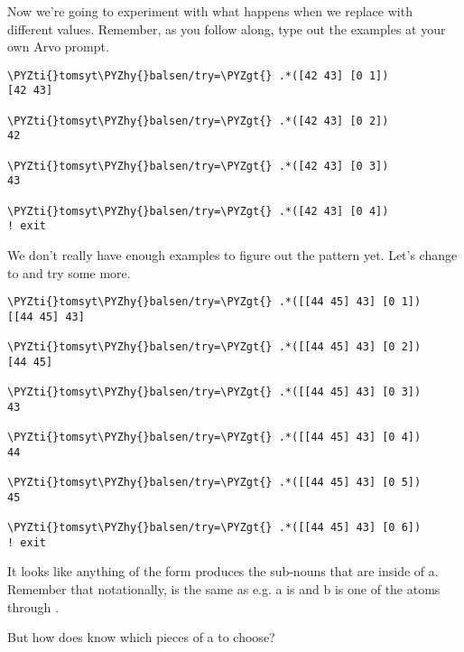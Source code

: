 Now we're going to experiment with what happens when we replace  with
different values. Remember, as you follow along, type out the examples at your
own Arvo prompt.
\begin{framed_shaded}
\begin{Verbatim}[fontsize=\relsize{-2.5},fontseries=b,commandchars=\\\{\}]
\PYZti{}tomsyt\PYZhy{}balsen/try=\PYZgt{} .*([42 43] [0 1])
[42 43]

\PYZti{}tomsyt\PYZhy{}balsen/try=\PYZgt{} .*([42 43] [0 2])
42

\PYZti{}tomsyt\PYZhy{}balsen/try=\PYZgt{} .*([42 43] [0 3])
43

\PYZti{}tomsyt\PYZhy{}balsen/try=\PYZgt{} .*([42 43] [0 4])
! exit
\end{Verbatim}
\end{framed_shaded}

We don't really have enough examples to figure out the pattern yet. Let's
change \kode{[42 43]} to \kode{[[44 45] 43]} and try some more.
\begin{framed_shaded}
\begin{Verbatim}[fontsize=\relsize{-2.5},fontseries=b,commandchars=\\\{\}]
\PYZti{}tomsyt\PYZhy{}balsen/try=\PYZgt{} .*([[44 45] 43] [0 1])
[[44 45] 43] 

\PYZti{}tomsyt\PYZhy{}balsen/try=\PYZgt{} .*([[44 45] 43] [0 2])
[44 45]

\PYZti{}tomsyt\PYZhy{}balsen/try=\PYZgt{} .*([[44 45] 43] [0 3])
43

\PYZti{}tomsyt\PYZhy{}balsen/try=\PYZgt{} .*([[44 45] 43] [0 4])
44

\PYZti{}tomsyt\PYZhy{}balsen/try=\PYZgt{} .*([[44 45] 43] [0 5])
45

\PYZti{}tomsyt\PYZhy{}balsen/try=\PYZgt{} .*([[44 45] 43] [0 6])
! exit
\end{Verbatim}
\end{framed_shaded}

It looks like anything of the form \kode{*[a [0 b]]} produces the sub-nouns that are
inside of a. Remember that notationally, \kode{*[a [0 b]]} is the same as  e.g. a is \kode{[[44 45] 43]} and b is one of the atoms  through . 

But how does  \kode{*[a [0 b]]} know which pieces of a to choose? 

